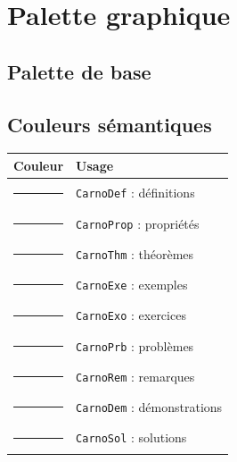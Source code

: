 \documentclass[a4paper,11pt]{article}
\begin{document}
\section{Palette graphique}

\subsection{Palette de base}

\noindent
{}

\bigskip

\subsection{Couleurs sémantiques}

\begin{center}
\renewcommand{\arraystretch}{1.4}
\begin{tabular}{|c|l|}
\hline
\textbf{Couleur} & \textbf{Usage} \\
\hline
\colorbox{CarnoDef}{\color{white}\rule{2cm}{0.2cm}} & \texttt{CarnoDef} : définitions \\
\hline
\colorbox{CarnoProp}{\color{white}\rule{2cm}{0.2cm}} & \texttt{CarnoProp} : propriétés \\
\hline
\colorbox{CarnoThm}{\color{white}\rule{2cm}{0.2cm}} & \texttt{CarnoThm} : théorèmes \\
\hline
\colorbox{CarnoExe}{\color{white}\rule{2cm}{0.2cm}} & \texttt{CarnoExe} : exemples \\
\hline
\colorbox{CarnoExo}{\color{white}\rule{2cm}{0.2cm}} & \texttt{CarnoExo} : exercices \\
\hline
\colorbox{CarnoPrb}{\color{white}\rule{2cm}{0.2cm}} & \texttt{CarnoPrb} : problèmes \\
\hline
\colorbox{CarnoRem}{\color{white}\rule{2cm}{0.2cm}} & \texttt{CarnoRem} : remarques \\
\hline
\colorbox{CarnoDem}{\color{white}\rule{2cm}{0.2cm}} & \texttt{CarnoDem} : démonstrations \\
\hline
\colorbox{CarnoSol}{\color{white}\rule{2cm}{0.2cm}} & \texttt{CarnoSol} : solutions \\
\hline
\end{tabular}
\end{center}
\end{document}
